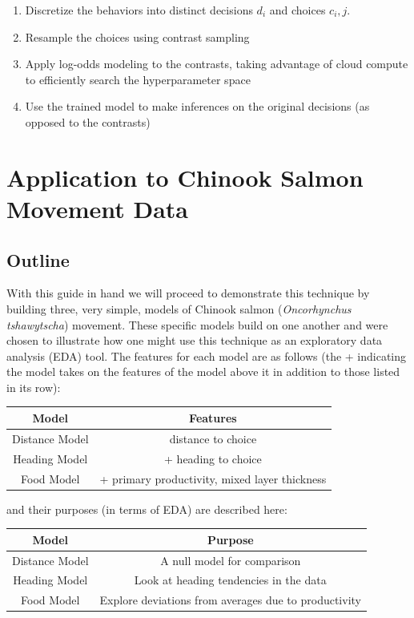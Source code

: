 \documentclass[11pt]{article}
\begin{document}
\begin{enumerate}
\item Discretize the behaviors into distinct decisions $d_i$ and choices $c_i,j$. 
\item Resample the choices using contrast sampling
\item Apply log-odds modeling to the contrasts, taking advantage of cloud compute to efficiently search the hyperparameter space
\item Use the trained model to make inferences on the original decisions (as opposed to the contrasts)
\end{enumerate}

\section*{Application to Chinook Salmon Movement Data}

\subsection*{Outline}

With this guide in hand we will proceed to demonstrate this technique by building three, very simple, models of Chinook salmon (\textit{Oncorhynchus tshawytscha}) movement. These specific models build on one another and were chosen to illustrate how one might use this technique as an exploratory data analysis (EDA) tool. The features for each model are as follows (the + indicating the model takes on the features of the model above it in addition to those listed in its row): 

\begin{center}
\begin{tabular}{| c | c  | } 
\hline 
Model & Features \\
\hline
Distance Model & distance to choice \\
Heading Model & + heading to choice \\
Food Model & + primary productivity, mixed layer thickness \\
\hline
\end{tabular}
\end{center}

and their purposes (in terms of EDA) are described here:

\begin{center}
\begin{tabular}{| c | c  | } 
\hline 
Model & Purpose \\
\hline
Distance Model & A null model for comparison \\
Heading Model & Look at heading tendencies in the data \\
Food Model & Explore deviations from averages due to productivity \\
\hline
\end{tabular}
\end{center} 
\end{document}
